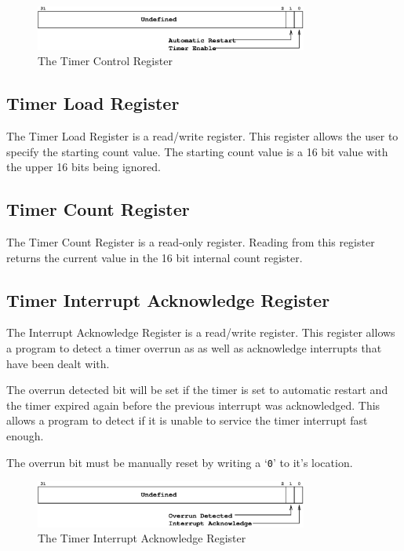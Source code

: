 \documentclass[a4paper,10pt]{article}
\begin{document}
\begin{figure}[h]
\begin{center}
\includegraphics[width=0.8\textwidth]{timer_cr.eps}
\caption{The Timer Control Register}
\label{timer_cr_pic}
\end{center}
\end{figure}

\subsection{Timer Load Register}

The Timer Load Register is a read/write register. This register allows
the user to specify the starting count value. The starting count value
is a 16 bit value with the upper 16 bits being ignored.

\subsection{Timer Count Register}

The Timer Count Register is a read-only register. Reading from this
register returns the current value in the 16 bit internal count
register.

\subsection{Timer Interrupt Acknowledge Register}

The Interrupt Acknowledge Register is a read/write register. This
register allows a program to detect a timer overrun as as well as
acknowledge interrupts that have been dealt with.

The overrun detected bit will be set if the timer is set to automatic
restart and the timer expired again before the previous interrupt was
acknowledged. This allows a program to detect if it is unable to
service the timer interrupt fast enough.

The overrun bit must be manually reset by writing a `\texttt{0}' to
it's location.

\begin{figure}[h]
\begin{center}
\includegraphics[width=0.8\textwidth]{timer_iack.eps}
\caption{The Timer Interrupt Acknowledge Register}
\label{timer_iack_pic}
\end{center}
\end{figure}
\end{document}
